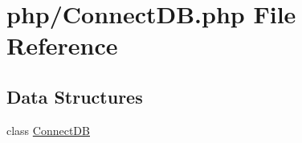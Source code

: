 \hypertarget{php_2_connect_d_b_8php}{}\section{php/\+Connect\+D\+B.php File Reference}
\label{php_2_connect_d_b_8php}
\subsection*{Data Structures}
\begin{DoxyCompactItemize}
\item 
class \hyperlink{class_connect_d_b}{Connect\+D\+B}
\end{DoxyCompactItemize}
